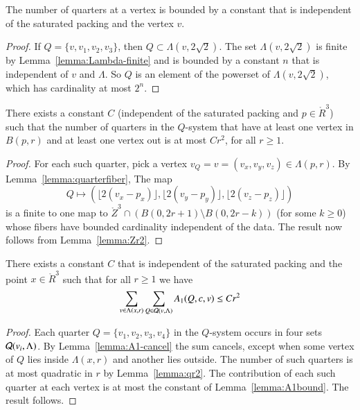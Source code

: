\begin{lemma} \label{lemma:quarterfiber}
The number of quarters at a vertex is bounded by a constant that
is independent of the saturated packing and the vertex $v$.
\end{lemma}

\begin{proof}  If $Q=\{v,v_1,v_2,v_3\}$, then $Q\subset
\Lambda(v,2\sqrt2)$.  The set $\Lambda(v,2\sqrt2)$ is finite by
Lemma~\ref{lemma:Lambda-finite} and is bounded by a constant $n$
that is independent of $v$ and $\Lambda$.  So $Q$ is an element of
the powerset of $\Lambda(v,2\sqrt2)$, which has cardinality at
most $2^n$.
\end{proof}

\begin{lemma}\label{lemma:qr2} There exists a constant $C$ (independent of the
saturated packing and $p\in\ring{R}^3$) such that the number of
quarters in the $Q$-system that have at least one vertex in
$B(p,r)$ and at least one vertex out is at most $C r^2$, for all
$r\ge 1$.
\end{lemma}

\begin{proof}  For each such quarter, pick a vertex $v_Q=v=(v_x,v_y,v_z)\in
\Lambda(p,r)$.  By Lemma~\ref{lemma:quarterfiber}, The map
    $$
    Q\mapsto (\lfloor 2(v_x-p_x)\rfloor, \lfloor
    2(v_y-p_y)\rfloor,\lfloor 2(v_z-p_z)\rfloor)
    $$
is a finite to one map to $\ring{Z}^3 \cap ( B(0,2r+1) \setminus
B(0,2r-k))$ (for some $k\ge 0$) whose fibers have bounded
cardinality independent of the data.  The result now follows from
Lemma~\ref{lemma:Zr2}.
\end{proof}

\begin{lemma}\label{lemma:negA1} There exists a constant $C$ that is independent of
the saturated packing and the point $x\in\ring{R}^3$ such that for
all $r\ge 1$ we have
$$\sum_{v\in\Lambda(x,r)} \sum_{Q\in{\mathcal Q}(v,\Lambda)}
      A_1 (Q,c,v) \le C r^2$$
\end{lemma}

\begin{proof}
Each quarter $Q=\{v_1,v_2,v_3,v_4\}$ in the $Q$-system occurs in
four sets ${\mathcal Q}(v_i,\Lambda)$.  By
Lemma~\ref{lemma:A1-cancel} the sum cancels, except when some
vertex of $Q$ lies inside $\Lambda(x,r)$ and another lies outside.
The number of such quarters is at most quadratic in $r$ by
Lemma~\ref{lemma:qr2}.  The contribution of each such quarter at
each vertex is at most the constant of Lemma~\ref{lemma:A1bound}.
The result follows.
\end{proof}

